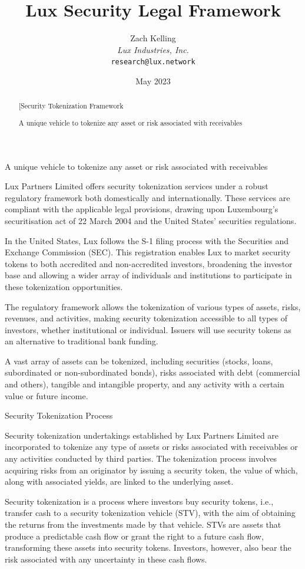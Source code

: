 \documentclass[11pt]{article}
\title{Lux Security Legal Framework}
\author{Zach Kelling\\\textit{Lux Industries, Inc.}\\\texttt{research@lux.network}}
\date{May 2023}
\begin{document}
\luxcoverpage

\begin{abstract}
[Security Tokenization Framework

A unique vehicle to tokenize any asset or risk associated with receivables
\end{abstract}

\tableofcontents
\newpage


A unique vehicle to tokenize any asset or risk associated with receivables


Lux Partners Limited offers security tokenization services under a robust regulatory framework both domestically and internationally. These services are compliant with the applicable legal provisions, drawing upon Luxembourg's securitisation act of 22 March 2004 and the United States' securities regulations.


In the United States, Lux follows the S-1 filing process with the Securities and Exchange Commission (SEC). This registration enables Lux to market security tokens to both accredited and non-accredited investors, broadening the investor base and allowing a wider array of individuals and institutions to participate in these tokenization opportunities.


The regulatory framework allows the tokenization of various types of assets, risks, revenues, and activities, making security tokenization accessible to all types of investors, whether institutional or individual. Issuers will use security tokens as an alternative to traditional bank funding.


A vast array of assets can be tokenized, including securities (stocks, loans, subordinated or non-subordinated bonds), risks associated with debt (commercial and others), tangible and intangible property, and any activity with a certain value or future income.


Security Tokenization Process


Security tokenization undertakings established by Lux Partners Limited are incorporated to tokenize any type of assets or risks associated with receivables or any activities conducted by third parties. The tokenization process involves acquiring risks from an originator by issuing a security token, the value of which, along with associated yields, are linked to the underlying asset.


Security tokenization is a process where investors buy security tokens, i.e., transfer cash to a security tokenization vehicle (STV), with the aim of obtaining the returns from the investments made by that vehicle. STVs are assets that produce a predictable cash flow or grant the right to a future cash flow, transforming these assets into security tokens. Investors, however, also bear the risk associated with any uncertainty in these cash flows.
\end{document}
